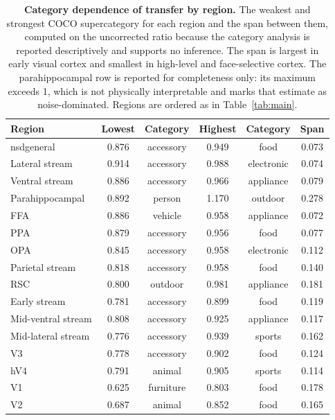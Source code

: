 \documentclass[11pt,a4paper]{article}
\begin{document}
\begin{table}[tb]
\centering
\caption{\textbf{Category dependence of transfer by region.} The weakest and
strongest COCO supercategory for each region and the span between them, computed
on the uncorrected ratio because the category analysis is reported descriptively
and supports no inference. The span
is largest in early visual cortex and smallest in high-level and face-selective
cortex. The parahippocampal row is reported for completeness only: its maximum
exceeds 1, which is not physically interpretable and marks that estimate as
noise-dominated. Regions are ordered as in Table~\ref{tab:main}.}
\label{tab:category}
\small
\begin{tabular}{lccccc}
\toprule
Region & Lowest & Category & Highest & Category & Span \\
\midrule
nsdgeneral          & \num{0.876} & accessory & \num{0.949} & food & \num{0.073} \\
Lateral stream      & \num{0.914} & accessory & \num{0.988} & electronic & \num{0.074} \\
Ventral stream      & \num{0.886} & accessory & \num{0.966} & appliance & \num{0.079} \\
Parahippocampal     & \num{0.892} & person & \num{1.170} & outdoor & \num{0.278} \\
FFA                 & \num{0.886} & vehicle & \num{0.958} & appliance & \num{0.072} \\
PPA                 & \num{0.879} & accessory & \num{0.956} & food & \num{0.077} \\
OPA                 & \num{0.845} & accessory & \num{0.958} & electronic & \num{0.112} \\
Parietal stream     & \num{0.818} & accessory & \num{0.958} & food & \num{0.140} \\
RSC                 & \num{0.800} & outdoor & \num{0.981} & appliance & \num{0.181} \\
Early stream        & \num{0.781} & accessory & \num{0.899} & food & \num{0.119} \\
Mid-ventral stream  & \num{0.808} & accessory & \num{0.925} & appliance & \num{0.117} \\
Mid-lateral stream  & \num{0.776} & accessory & \num{0.939} & sports & \num{0.162} \\
V3                  & \num{0.778} & accessory & \num{0.902} & food & \num{0.124} \\
hV4                 & \num{0.791} & animal & \num{0.905} & sports & \num{0.114} \\
V1                  & \num{0.625} & furniture & \num{0.803} & food & \num{0.178} \\
V2                  & \num{0.687} & animal & \num{0.852} & food & \num{0.165} \\
\bottomrule
\end{tabular}
\end{table}
\end{document}
